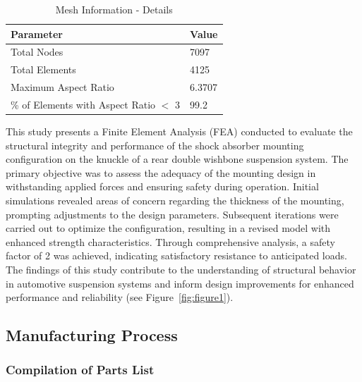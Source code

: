 \begin{table}[H] %
\centering
\caption{Mesh Information - Details}
\begin{tabular}{@{}ll@{}}
\toprule
\textbf{Parameter} & \textbf{Value} \\
\midrule
Total Nodes & 7097 \\
Total Elements & 4125 \\
Maximum Aspect Ratio & 6.3707 \\
\% of Elements with Aspect Ratio $<$ 3 & 99.2 \\
\bottomrule
\end{tabular}
\end{table}

This study presents a Finite Element Analysis (FEA) conducted to evaluate the structural integrity and performance of the shock absorber mounting configuration on the knuckle of a rear double wishbone suspension system. The primary objective was to assess the adequacy of the mounting design in withstanding applied forces and ensuring safety during operation. Initial simulations revealed areas of concern regarding the thickness of the mounting, prompting adjustments to the design parameters. Subsequent iterations were carried out to optimize the configuration, resulting in a revised model with enhanced strength characteristics. Through comprehensive analysis, a safety factor of 2 was achieved, indicating satisfactory resistance to anticipated loads. The findings of this study contribute to the understanding of structural behavior in automotive suspension systems and inform design improvements for enhanced performance and reliability (see Figure~\ref{fig:figure1}).



\subsection{Manufacturing Process}
\subsubsection{Compilation of Parts List}

